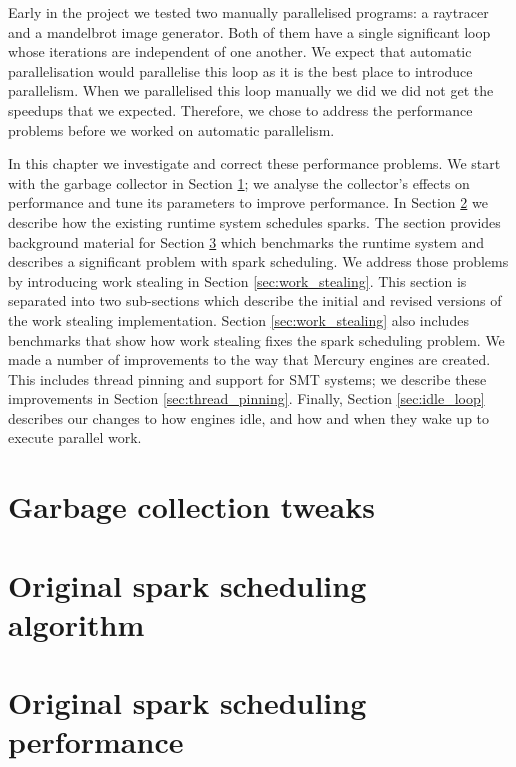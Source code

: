

Early in the project
we tested two manually parallelised programs:
a raytracer and a mandelbrot image generator.
Both of them have a single significant loop
whose iterations are independent of one another.
We expect that automatic parallelisation would parallelise this loop
as it is the best place to introduce parallelism.
When we parallelised this loop manually we did
we did not get the speedups that we expected.
Therefore,
we chose to address the performance problems
before we worked on automatic parallelism.

In this chapter we investigate and correct these performance problems.
We start with the garbage collector in Section \ref{sec:gc};
we analyse the collector's effects on performance and tune its parameters
to improve performance.
In Section \ref{sec:original_scheduling} we describe how the existing runtime
system schedules sparks.
The section provides background material for Section
\ref{sec:original_scheduling_performance}
which benchmarks the runtime system and describes a significant problem with
spark scheduling.
We address those problems by introducing work stealing in Section
\ref{sec:work_stealing}.
This section is separated into two sub-sections
which describe the initial and revised versions of the work stealing
implementation.
Section \ref{sec:work_stealing} also includes benchmarks that show
how work stealing fixes the spark scheduling problem.
We made a number of improvements to the way that Mercury engines are created.
This includes thread pinning and support for SMT systems;
we describe these improvements in Section \ref{sec:thread_pinning}.
Finally, Section \ref{sec:idle_loop} describes our changes to how engines
idle,
and how and when they wake up to execute parallel work.

\section{Garbage collection tweaks}
\label{sec:gc}



\section{Original spark scheduling algorithm}
\label{sec:original_scheduling}



\section{Original spark scheduling performance}
\label{sec:original_scheduling_performance}

